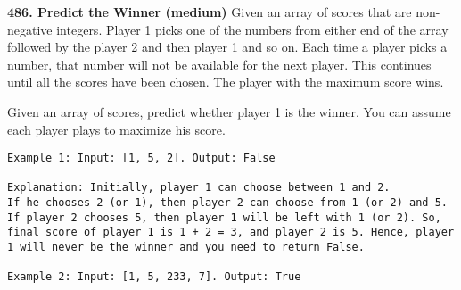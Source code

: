 \documentclass[../main.tex]{subfiles}
\begin{document}
\begin{examples}[resume]
\item \textbf{486. Predict the Winner (medium)}
Given an array of scores that are non-negative integers. Player 1 picks one of the numbers from either end of the array followed by the player 2 and then player 1 and so on. Each time a player picks a number, that number will not be available for the next player. This continues until all the scores have been chosen. The player with the maximum score wins.

Given an array of scores, predict whether player 1 is the winner. You can assume each player plays to maximize his score.
\begin{lstlisting}[numbers=none]
Example 1: Input: [1, 5, 2]. Output: False

Explanation: Initially, player 1 can choose between 1 and 2. 
If he chooses 2 (or 1), then player 2 can choose from 1 (or 2) and 5. If player 2 chooses 5, then player 1 will be left with 1 (or 2). So, final score of player 1 is 1 + 2 = 3, and player 2 is 5. Hence, player 1 will never be the winner and you need to return False.

Example 2: Input: [1, 5, 233, 7]. Output: True


\end{lstlisting}
\end{examples}
\end{document}
